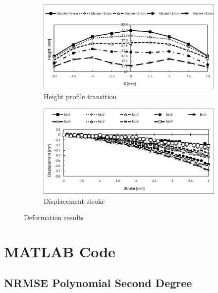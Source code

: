 \begin{figure}
    \centering
    \begin{subfigure}[b]{0.5\textwidth}
    \centering
    \includegraphics[width=\textwidth]{Images/appendix/ynu/fig7hightprofiletransition.png}
    \caption{Height profile transition}
    \label{fig:heighttrans}
    \end{subfigure}
    \hfill
    \begin{subfigure}[b]{0.5\textwidth}
    \centering
    \includegraphics[width=\textwidth]{Images/appendix/ynu/fig8displacementsstroke.png}
    \caption{Displacement stroke}
    \label{fig:disstroke}
    \end{subfigure}
    \vspace{0.5cm}
    \caption{Deformation results}
    \label{fig:defmeasurementynu}
\end{figure}

\section{MATLAB Code}
\subsection*{NRMSE Polynomial Second Degree}

